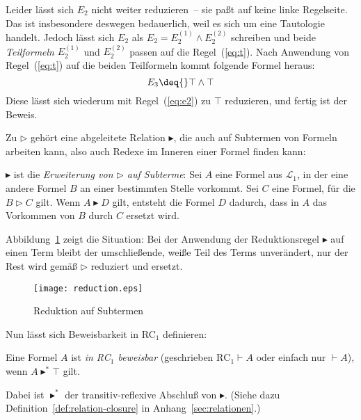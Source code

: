 Leider lässt sich $E_2$ nicht weiter reduzieren~-- sie paßt auf
keine linke Regelseite.  Das ist insbesondere deswegen bedauerlich, weil es sich
um eine Tautologie handelt.  Jedoch lässt sich $E_2$ als $E_2 = E_2^{(1)} \wedge
E_2^{(2)}$ schreiben und beide \textit{Teilformeln} $E_2^{(1)}$ und $E_2^{(2)}$
passen auf die Regel~(\ref{eq:t}).  Nach Anwendung von Regel~(\ref{eq:t}) auf die beiden
Teilformeln kommt folgende Formel heraus:
%
  \begin{displaymath}
    E_3 \deq{} \top \wedge \top
  \end{displaymath}
%
  Diese lässt sich wiederum mit Regel~(\ref{eq:e2}) zu $\top$ reduzieren,
  und fertig ist der Beweis.

Zu $\triangleright$ gehört eine abgeleitete
Relation $\blacktriangleright$, die auch auf
Subtermen von Formeln arbeiten kann, also auch Redexe im Inneren einer Formel
finden kann:
%
\begin{definition}
  $\blacktriangleright$ ist die \textit{Erweiterung von $\triangleright$ auf
    Subterme}: Sei $A$ eine Formel aus $\mathcal{L}_1$, in der eine andere
  Formel $B$ an einer bestimmten Stelle vorkommt.  Sei $C$ eine Formel, für die
  $B\triangleright C$ gilt.  Wenn
  $A\blacktriangleright D$ gilt, entsteht die Formel $D$ dadurch, dass in $A$
  das Vorkommen von $B$ durch $C$ ersetzt wird.  
\end{definition}
%
Abbildung~\ref{fig:reduction} zeigt die Situation: Bei der Anwendung
der Reduktionsregel $\blacktriangleright$ auf einen Term bleibt der
umschließende, weiße Teil des Terms unverändert, nur der Rest wird
gemäß $\triangleright$ reduziert und ersetzt.

\begin{figure}[tb]
  \begin{center}
    {
      \texttt{[image: reduction.eps]}
      }
    \caption{Reduktion auf Subtermen}
    \label{fig:reduction}
  \end{center}
\end{figure}


Nun lässt sich Beweisbarkeit in RC$_1$ definieren:
%
\begin{definition}[Beweisbarkeit in RC$_1$]
  Eine Formel $A$ ist \textit{in RC$_1$ beweisbar} (geschrieben
  $\mathrm{RC}_1 \vdash A$ oder einfach nur $\vdash A$), wenn
  $A\blacktriangleright^\ast\top$ gilt.
\end{definition}
%
Dabei ist $\blacktriangleright^\ast$ der
transitiv-reflexive Abschluß von $\blacktriangleright$.  (Siehe dazu
  Definition~\ref{def:relation-closure} in
  Anhang~\ref{sec:relationen}.)


